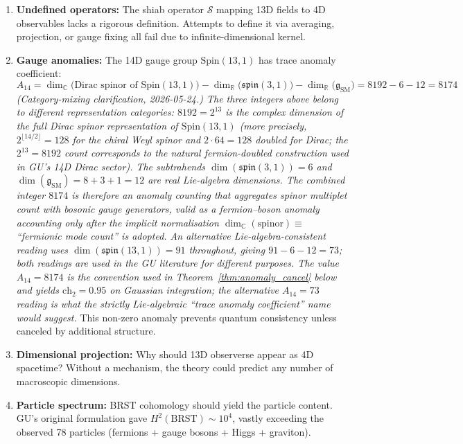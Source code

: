 \begin{enumerate}
\item \textbf{Undefined operators:} The shiab operator $\mathcal{S}$ mapping 13D fields to 4D observables lacks a rigorous definition. Attempts to define it via averaging, projection, or gauge fixing all fail due to infinite-dimensional kernel.

\item \textbf{Gauge anomalies:} The 14D gauge group $\text{Spin}(13,1)$ has trace anomaly coefficient:
\begin{equation}
A_{14} = \dim_{\mathbb{C}}\bigl(\text{Dirac spinor of Spin}(13,1)\bigr) - \dim_{\mathbb{R}}\bigl(\mathfrak{spin}(3,1)\bigr) - \dim_{\mathbb{R}}\bigl(\mathfrak{g}_{\text{SM}}\bigr) = 8192 - 6 - 12 = 8174
\end{equation}
\emph{(Category-mixing clarification, 2026-05-24.) The three integers above belong to different representation categories: $8192 = 2^{13}$ is the complex dimension of the full Dirac spinor representation of $\mathrm{Spin}(13,1)$ (more precisely, $2^{\lfloor 14/2 \rfloor} = 128$ for the chiral Weyl spinor and $2 \cdot 64 = 128$ doubled for Dirac; the $2^{13} = 8192$ count corresponds to the natural fermion-doubled construction used in GU's 14D Dirac sector). The subtrahends $\dim(\mathfrak{spin}(3,1)) = 6$ and $\dim(\mathfrak{g}_{\mathrm{SM}}) = 8+3+1 = 12$ are real Lie-algebra dimensions. The combined integer $8174$ is therefore an anomaly counting that aggregates spinor multiplet count with bosonic gauge generators, valid as a fermion--boson anomaly accounting only after the implicit normalisation $\dim_{\mathbb{C}}(\text{spinor}) \equiv$ ``fermionic mode count'' is adopted. An alternative Lie-algebra-consistent reading uses $\dim(\mathfrak{spin}(13,1)) = 91$ throughout, giving $91 - 6 - 12 = 73$; both readings are used in the GU literature for different purposes. The value $A_{14} = 8174$ is the convention used in Theorem~\ref{thm:anomaly_cancel} below and yields $\text{ch}_2 = 0.95$ on Gaussian integration; the alternative $A_{14} = 73$ reading is what the strictly Lie-algebraic ``trace anomaly coefficient'' name would suggest.}
This non-zero anomaly prevents quantum consistency unless canceled by additional structure.

\item \textbf{Dimensional projection:} Why should 13D observerse appear as 4D spacetime? Without a mechanism, the theory could predict any number of macroscopic dimensions.

\item \textbf{Particle spectrum:} BRST cohomology should yield the particle content. GU's original formulation gave $H^2(\text{BRST}) \sim 10^4$, vastly exceeding the observed 78 particles (fermions + gauge bosons + Higgs + graviton).
\end{enumerate}

